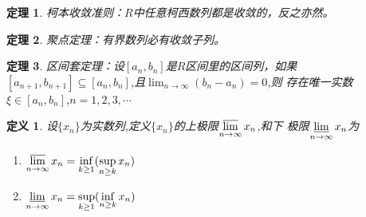 \documentclass[UTF8]{ctexbook}
\newtheorem{definition}{定义}[chapter]
\newtheorem{thm}{定理}[chapter]
\begin{document}
\begin{thm}
    柯本收敛准则：$R$中任意柯西数列都是收敛的，反之亦然。
\end{thm}

\begin{thm}
    聚点定理：有界数列必有收敛子列。
\end{thm}

\begin{thm}
    区间套定理：设$[ a_n, b_n ] $是$R$区间里的区间列，如果$[a_{n+1},b_{n+1}]
    \subseteq [ a_n, b_n ]$,且$ \lim_{n \to \infty} (b_n - a_n) = 0$,则
    存在唯一实数$\xi \in [a_n, b_n]$,$ n = 1, 2,3 ,\cdots$
\end{thm}

\begin{definition}
    设$\{x_n\}$为实数列,定义$\{x_n\}$的上极限$\varlimsup\limits_{n \to \infty} x_n$,和下
    极限$\varliminf\limits_{n \to \infty} x_n$为
    \begin{enumerate}
        \item $\varlimsup\limits_{n \to \infty} x_n = \inf\limits_{k \geq 1}( \sup\limits_{n \geq k} x_n) $
        \item $\varliminf\limits_{n \to \infty} x_n = \sup\limits_{k \geq 1}( \inf\limits_{n \geq k} x_n) $
    \end{enumerate}
\end{definition}
\end{document}
